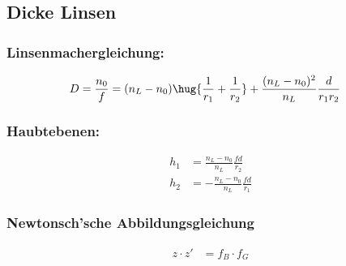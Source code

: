 \documentclass[twocolumn, unnumberedsubsub]{summery_3.1}
\begin{document}
\subsection{Dicke Linsen}
\subsubsection*{Linsenmachergleichung:}\tight
\begin{align*}
    D = \frac {n_0}f &= (n_L - n_0)\hug{\frac 1{r_1} + \frac 1{r_2}}
    + \frac{(n_L - n_0)^2}{n_L}\frac{d}{r_1r_2}
\end{align*}\ttight

\subsubsection*{Haubtebenen:}
\tight
\begin{align*}
    h_1 &= \frac{n_L - n_0}{n_L} \frac{f d}{r_2}\\
    h_2 &= -\frac{n_L - n_0}{n_L} \frac{f d}{r_1}
\end{align*}\ttight

\subsubsection*{Newtonsch'sche Abbildungsgleichung}\tight
\begin{align*}
    z\cdot z' &= f_B \cdot f_G
\end{align*}\ttight
\end{document}
